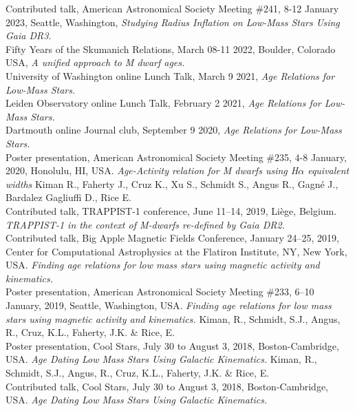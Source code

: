 \documentclass[10pt]{cv}
\begin{document}
\begin{llist}
Contributed talk, American Astronomical Society Meeting \#241, 8-12 January 2023, Seattle, Washington, \textit{Studying Radius Inflation on Low-Mass Stars Using Gaia DR3}.\\
Fifty Years of the Skumanich Relations, March 08-11 2022, Boulder, Colorado USA, \textit{A unified approach to M dwarf ages.}\\
University of Washington online Lunch Talk, March 9 2021, \textit{Age Relations for Low-Mass Stars.}\\
Leiden Observatory online Lunch Talk, February 2 2021, \textit{Age Relations for Low-Mass Stars.}\\
Dartmouth online Journal club, September 9 2020, \textit{Age Relations for Low-Mass Stars.}\\
Poster presentation, American Astronomical Society Meeting \#235, 4-8 January, 2020, Honolulu, HI, USA. \textit{Age-Activity relation for M dwarfs using H$\alpha$ equivalent widths} Kiman R., Faherty J., Cruz K., Xu S., Schmidt S., Angus R., Gagn\'e J., Bardalez Gagliuffi D., Rice E.\\
Contributed talk, TRAPPIST-1 conference, June 11--14, 2019, Li\`ege, Belgium. \textit{TRAPPIST-1 in the context of M-dwarfs re-defined by Gaia DR2.}\\
Contributed talk, Big Apple Magnetic Fields Conference, January 24--25, 2019, Center for Computational Astrophysics at the Flatiron Institute, NY, New York, USA. \textit{Finding age relations for low mass stars using magnetic activity and kinematics.}\\
Poster presentation, American Astronomical Society Meeting \#233, 6--10 January, 2019, Seattle, Washington, USA. \textit{Finding age relations for low mass stars using magnetic activity and kinematics.} Kiman, R., Schmidt, S.J., Angus, R., Cruz, K.L., Faherty, J.K. \& Rice, E.\\
Poster presentation, Cool Stars, July 30 to August 3, 2018, Boston-Cambridge, USA. \textit{Age Dating Low Mass Stars Using Galactic Kinematics.} Kiman, R., Schmidt, S.J., Angus, R., Cruz, K.L., Faherty, J.K. \& Rice, E.\\
Contributed talk, Cool Stars, July 30 to August 3, 2018, Boston-Cambridge, USA. \textit{Age Dating Low Mass Stars Using Galactic Kinematics.} \\

\end{llist}
\end{document}
